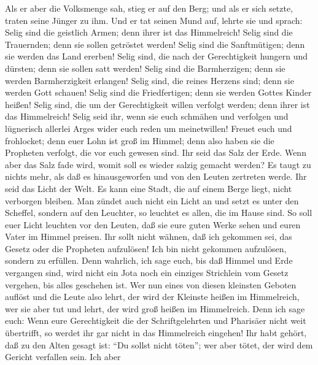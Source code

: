  Als er aber die Volksmenge sah, stieg er auf den Berg;
und als er sich setzte, traten seine Jünger zu ihm.  Und
er tat seinen Mund auf, lehrte sie und sprach:  Selig sind
die geistlich Armen; denn ihrer ist das Himmelreich! 
Selig sind die Trauernden; denn sie sollen getröstet werden!
 Selig sind die Sanftmütigen; denn sie werden das Land
ererben!  Selig sind, die nach der Gerechtigkeit hungern
und dürsten; denn sie sollen satt werden!  Selig sind die
Barmherzigen; denn sie werden Barmherzigkeit erlangen! 
Selig sind, die reines Herzens sind; denn sie werden Gott schauen!
 Selig sind die Friedfertigen; denn sie werden Gottes
Kinder heißen!  Selig sind, die um der Gerechtigkeit
willen verfolgt werden; denn ihrer ist das Himmelreich! 
Selig seid ihr, wenn sie euch schmähen und verfolgen und lügnerisch
allerlei Arges wider euch reden um meinetwillen!  Freuet
euch und frohlocket; denn euer Lohn ist groß im Himmel; denn also haben
sie die Propheten verfolgt, die vor euch gewesen sind. 
Ihr seid das Salz der Erde. Wenn aber das Salz fade wird, womit soll es
wieder salzig gemacht werden? Es taugt zu nichts mehr, als daß es
hinausgeworfen und von den Leuten zertreten werde.  Ihr
seid das Licht der Welt. Es kann eine Stadt, die auf einem Berge liegt,
nicht verborgen bleiben.  Man zündet auch nicht ein Licht
an und setzt es unter den Scheffel, sondern auf den Leuchter, so
leuchtet es allen, die im Hause sind.  So soll euer Licht
leuchten vor den Leuten, daß sie eure guten Werke sehen und euren Vater
im Himmel preisen.  Ihr sollt nicht wähnen, daß ich
gekommen sei, das Gesetz oder die Propheten aufzulösen! Ich bin nicht
gekommen aufzulösen, sondern zu erfüllen.  Denn wahrlich,
ich sage euch, bis daß Himmel und Erde vergangen sind, wird nicht ein
Jota noch ein einziges Strichlein vom Gesetz vergehen, bis alles
geschehen ist.  Wer nun eines von diesen kleinsten
Geboten auflöst und die Leute also lehrt, der wird der Kleinste heißen
im Himmelreich, wer sie aber tut und lehrt, der wird groß heißen im
Himmelreich.  Denn ich sage euch: Wenn eure Gerechtigkeit
die der Schriftgelehrten und Pharisäer nicht weit übertrifft, so werdet
ihr gar nicht in das Himmelreich eingehen!  Ihr habt
gehört, daß zu den Alten gesagt ist: ``Du sollst nicht töten''; wer aber
tötet, der wird dem Gericht verfallen sein.  Ich aber
